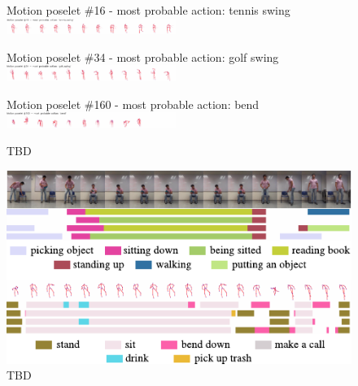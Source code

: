 \begin{figure}[th]
\begin{center}
\scriptsize
 Motion poselet \#16 - most probable action: tennis swing\\
 \includegraphics[trim=0 0 5.5cm 0.25cm, clip, width=0.49\textwidth]{Fig/poselets4}

 Motion poselet \#34 - most probable action: golf swing\\
 \includegraphics[trim=0 0 5.5cm 0.25cm,clip, width=0.49\textwidth]{Fig/poselets5}

 Motion poselet \#160 - most probable action: bend\\
 \includegraphics[trim=0 0 5.5cm 0.25cm, clip, width=0.49\textwidth]{Fig/poselets6}

\end{center}
\caption{TBD}
\label{fig:poselets_skel}
\end{figure}

 

\begin{figure}[th]
\begin{center}
\scriptsize
\includegraphics[]{Fig/labels_acciones}
\end{center}
\caption{TBD}
\label{fig:actionlabels}
\end{figure}


